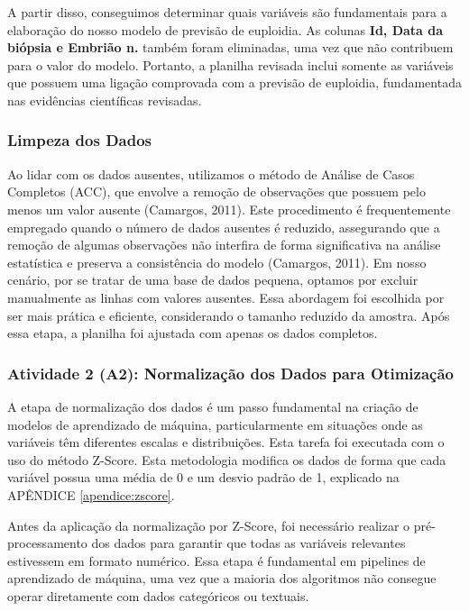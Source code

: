 A partir disso, conseguimos determinar quais variáveis são fundamentais para a elaboração do nosso modelo de previsão de euploidia. As colunas \textbf{Id, Data da biópsia e Embrião n.} também foram eliminadas, uma vez que não contribuem para o valor do modelo. Portanto, a planilha revisada inclui somente as variáveis que possuem uma ligação comprovada com a previsão de euploidia, fundamentada nas evidências científicas revisadas.

\subsubsection{Limpeza dos Dados}
Ao lidar com os dados ausentes, utilizamos o método de Análise de Casos Completos (ACC), que envolve a remoção de observações que possuem pelo menos um valor ausente (Camargos, 2011). Este procedimento é frequentemente empregado quando o número de dados ausentes é reduzido, assegurando que a remoção de algumas observações não interfira de forma significativa na análise estatística e preserva a consistência do modelo (Camargos, 2011). Em nosso cenário, por se tratar de uma base de dados pequena, optamos por excluir manualmente as linhas com valores ausentes. Essa abordagem foi escolhida por ser mais prática e eficiente, considerando o tamanho reduzido da amostra. Após essa etapa, a planilha foi ajustada com apenas os dados completos.

\subsubsection{Atividade 2 (A2): Normalização dos Dados para Otimização}
A etapa de normalização dos dados é um passo fundamental na criação de modelos de aprendizado de máquina, particularmente em situações onde as variáveis têm diferentes escalas e distribuições. Esta tarefa foi executada com o uso do método Z-Score. Esta metodologia modifica os dados de forma que cada variável possua uma média de 0 e um desvio padrão de 1, explicado na APÊNDICE \ref{apendice:zscore}. 

Antes da aplicação da normalização por Z-Score, foi necessário realizar o pré-processamento dos dados para garantir que todas as variáveis relevantes estivessem em formato numérico. Essa etapa é fundamental em pipelines de aprendizado de máquina, uma vez que a maioria dos algoritmos não consegue operar diretamente com dados categóricos ou textuais. 

